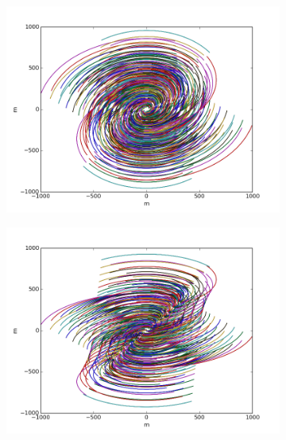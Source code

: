 \documentclass[a4paper,10pt]{report}
\begin{document}
\begin{figure}[h]
\begin{mdframed}
\begin{subfigure}[b]{0.3\textwidth}
  \includegraphics[width=\textwidth]{images/evla_observation/6hr_dec60.png}
  \caption{}
 \end{subfigure}
 \begin{subfigure}[b]{0.3\textwidth}
  \includegraphics[width=\textwidth]{images/evla_observation/6hr_dec30.png}
  \caption{}
 \end{subfigure}
 \begin{subfigure}[b]{0.3\textwidth}

\end{subfigure}
\end{mdframed}
\end{figure}
\end{document}

